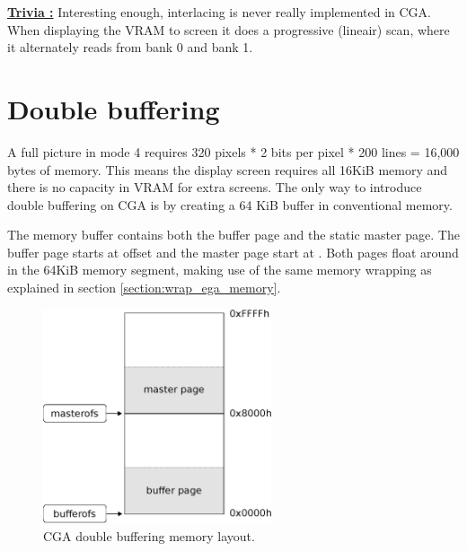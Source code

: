 \documentclass[book.tex]{subfiles}
\begin{document}
\par
\textbf{\underline{Trivia :}} Interesting enough, interlacing is never really implemented in CGA. When displaying the VRAM to screen it does a progressive (lineair) scan, where it alternately reads from bank 0 and bank 1.\\
\par


\section{Double buffering}
A full picture in mode 4 requires 320 pixels * 2 bits per pixel * 200 lines = 16,000 bytes of memory. This means the display screen requires all 16KiB memory and there is no capacity in VRAM for extra screens. The only way to introduce double buffering on CGA is by creating a 64 KiB buffer in conventional memory.  \\
\par
\begin{minipage}{\textwidth}
  
\end{minipage}
\label{state_type}
\par
The memory buffer contains both the buffer page and the static master page. The buffer page starts at offset  and the master page start at . Both pages float around in the 64KiB memory segment, making use of the same memory wrapping as explained in section \ref{section:wrap_ega_memory}.


\begin{figure}[H]
\centering
\includegraphics[width=0.6\textwidth]{imgs/drawings/cga_screenseg.eps}
\caption{CGA double buffering memory layout.}
\label{fig:cga_screenseg}
\end{figure}
\end{document}
